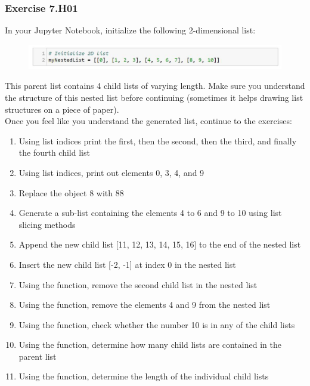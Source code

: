 \subsubsection*{Exercise 7.H01}
In your Jupyter Notebook, initialize the following 2-dimensional list:
\begin{figure}[H]
		\centering
		\includegraphics[width=\textwidth]{../IMG/7H01.png} 
\end{figure}
This parent list contains 4 child lists of varying length. Make sure you understand the
structure of this nested list before continuing (sometimes it helps drawing list structures on
a piece of paper).\\
Once you feel like you understand the generated list, continue to the exercises:
\begin{enumerate}[label=(\alph*)]
	\item Using list indices print the first, then the second, then the third, and finally the fourth child list
	\item Using list indices, print out elements 0, 3, 4, and 9
	\item Replace the object 8 with 88
	\item Generate a sub-list containing the elements 4 to 6 and 9 to 10 using list slicing
methods
	\item Append the new child list [11, 12, 13, 14, 15, 16] to the end of the nested
list
	\item Insert the new child list [-2, -1] at index 0 in the nested list
	\item Using the {} function, remove the second child list in the nested list
	\item Using the {} function, remove the elements 4 and 9 from the nested list
	\item Using the {} function, check whether the number 10 is in any of the child lists
	\item Using the {} function, determine how many child lists are contained in the parent list
	\item Using the {} function, determine the length of the individual child lists
\end{enumerate}


